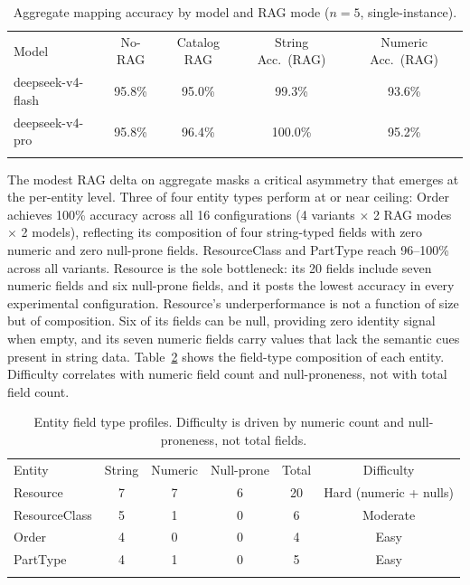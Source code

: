 \documentclass[3p,times,procedia]{elsarticle}
\begin{document}
\begin{table}[h]
\caption{Aggregate mapping accuracy by model and RAG mode ($n=5$, single-instance).}
\label{tab:aggregate-accuracy}
\begin{tabular*}{\hsize}{@{\extracolsep{\fill}}lcccc@{}}
\toprule
Model & No-RAG & Catalog RAG & String Acc.\ (RAG) & Numeric Acc.\ (RAG) \\
\colrule
deepseek-v4-flash & 95.8\% & 95.0\% & 99.3\% & 93.6\% \\
deepseek-v4-pro  & 95.8\% & 96.4\% & 100.0\% & 95.2\% \\
\botrule
\end{tabular*}
\end{table}

The modest RAG delta on aggregate masks a critical asymmetry that emerges at the per-entity level. Three of four entity types perform at or near ceiling: Order achieves 100\% accuracy across all 16 configurations (4 variants $\times$ 2 RAG modes $\times$ 2 models), reflecting its composition of four string-typed fields with zero numeric and zero null-prone fields. ResourceClass and PartType reach 96--100\% across all variants. Resource is the sole bottleneck: its 20 fields include seven numeric fields and six null-prone fields, and it posts the lowest accuracy in every experimental configuration. Resource's underperformance is not a function of size but of composition. Six of its fields can be null, providing zero identity signal when empty, and its seven numeric fields carry values that lack the semantic cues present in string data. Table~\ref{tab:entity-profiles} shows the field-type composition of each entity. Difficulty correlates with numeric field count and null-proneness, not with total field count.

\begin{table}[h]
\footnotesize
\caption{Entity field type profiles. Difficulty is driven by numeric count and null-proneness, not total fields.}
\label{tab:entity-profiles}
\begin{tabular*}{\hsize}{@{\extracolsep{\fill}}lccccc@{}}
\toprule
Entity & String & Numeric & Null-prone & Total & Difficulty \\
\colrule
Resource      & 7 & 7 & 6 & 20 & Hard (numeric + nulls) \\
ResourceClass & 5 & 1 & 0 &  6 & Moderate \\
Order         & 4 & 0 & 0 &  4 & Easy \\
PartType      & 4 & 1 & 0 &  5 & Easy \\
\botrule
\end{tabular*}
\end{table}
\end{document}
